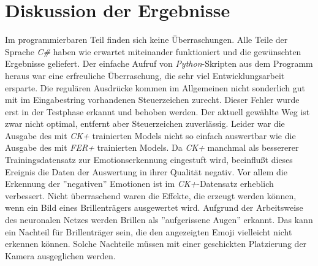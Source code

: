 \documentclass[12pt,a4paper,headinclude,twoside, plainheadsepline, open=right,numbers=noenddot]{scrreprt}
\begin{document}
\section{Diskussion der Ergebnisse}
Im programmierbaren Teil finden sich keine \"{U}berraschungen. Alle Teile der Sprache \textit{C\#} haben wie erwartet miteinander funktioniert und die gew\"{u}nschten Ergebnisse geliefert. Der einfache Aufruf von \textit{Python}-Skripten aus dem Programm heraus war eine erfreuliche \"{U}berraschung, die sehr viel Entwicklungsarbeit ersparte. Die regul\"{a}ren Ausdr\"{u}cke kommen im Allgemeinen nicht sonderlich gut mit im Eingabestring vorhandenen Steuerzeichen zurecht. Dieser Fehler wurde erst in der Testphase erkannt und behoben werden. Der aktuell gew\"{a}hlte Weg ist zwar nicht optimal, entfernt aber Steuerzeichen zuverl\"{a}ssig. Leider war die Ausgabe des mit \textit{CK+} trainierten Models nicht so einfach auswertbar wie die Ausgabe des mit \textit{FER+} trainierten Models. Da \textit{CK+} manchmal als bessererer Trainingsdatensatz zur Emotionserkennung eingestuft wird, beeinflu{\ss}t dieses Ereignis die Daten der Auswertung in ihrer Qualit\"{a}t negativ. Vor allem die Erkennung der ''negativen'' Emotionen ist im \textit{CK+}-Datensatz erheblich verbessert.  Nicht \"{u}berraschend waren die Effekte, die erzeugt werden k\"{o}nnen, wenn ein Bild eines Brillentr\"{a}gers ausgewertet wird. Aufgrund der Arbeitsweise des neuronalen Netzes werden Brillen als ''aufgerissene Augen'' erkannt. Das kann ein Nachteil f\"{u}r Brillentr\"{a}ger sein, die den angezeigten Emoji vielleicht nicht erkennen k\"{o}nnen. Solche Nachteile m\"{u}ssen mit einer geschickten Platzierung der Kamera ausgeglichen werden.
\end{document}
